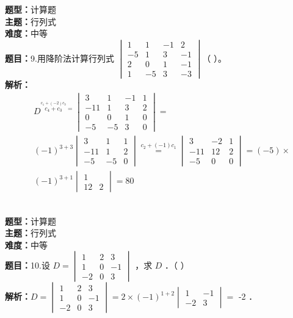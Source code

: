 \documentclass{ctexart}
\newenvironment{question}[5]{%
	\noindent\textbf{题型：}#1\\
	\textbf{主题：}#2\\
	\textbf{难度：}#3\\
	\textbf{题目：}#4\\
	\textbf{解析：}#5\\
	\vspace{1em}
}{}
\begin{document}
	\begin{question}
		{计算题}
		{行列式}
		{中等}
		{9.用降阶法计算行列式 $\begin{vmatrix}1 & 1 & -1 & 2 \\ -5 & 1 & 3 & -1 \\ 2 & 0 & 1 & -1 \\ 1 & -5 & 3 & -3\end{vmatrix}$（ ）。}
		{$$
			\begin{aligned}
				&D^{\stackrel{c_1+(-2) c_3}{c_4+c_3}=}\begin{vmatrix}
					3 & 1 & -1 & 1 \\
					-11 & 1 & 3 & 2 \\
					0 & 0 & 1 & 0 \\
					-5 & -5 & 3 & 0
				\end{vmatrix}= \\
				& (-1)^{3+3}\begin{vmatrix}
					3 & 1 & 1 \\
					-11 & 1 & 2 \\
					-5 & -5 & 0
				\end{vmatrix} \stackrel{c_2+(-1) c_1}{=}\begin{vmatrix}
					3 & -2 & 1 \\
					-11 & 12 & 2 \\
					-5 & 0 & 0
				\end{vmatrix}=(-5) \times \\
				& (-1)^{3+1}\begin{vmatrix}
					1 \\
					12 & 2
				\end{vmatrix}=80
			\end{aligned}
			$$}
	\end{question}
	
	
	\begin{question}
		{计算题}
		{行列式}
		{中等}
		{10.设 $D=\begin{vmatrix}1 & 2 & 3 \\ 1 & 0 & -1 \\ -2 & 0 & 3\end{vmatrix}$ ，求 $D$ ．（ ）}
		{$D=\begin{vmatrix}1 & 2 & 3 \\ 1 & 0 & -1 \\ -2 & 0 & 3\end{vmatrix}=2 \times(-1)^{1+2}\begin{vmatrix}1 & -1 \\ -2 & 3\end{vmatrix}=$ -2 ．}
	\end{question}
	
\end{document}

